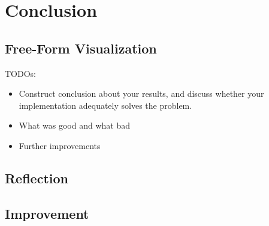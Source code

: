 \documentclass{article}
\begin{document}
\section{Conclusion}

\subsection{Free-Form Visualization}
\color{red}
TODOs:
\begin{itemize}
    \item Construct conclusion about your results, and discuss whether your implementation adequately solves the problem.
    \item What was good and what bad
    \item Further improvements
\end{itemize}
\color{black}

\subsection{Reflection}

\subsection{Improvement}



\end{document}
